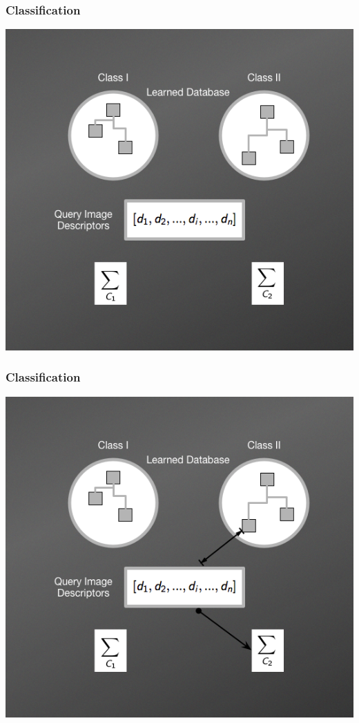 \documentclass[11pt]{beamer}
\begin{document}
    \begin{frame}
        \frametitle{Classification}
        \begin{center}
            \item \includegraphics[scale=0.38]{img/NBNNMethod1.png}     
        \end{center}
    \end{frame}
    
    \begin{frame}
        \frametitle{Classification}
        \begin{center}
            \item \includegraphics[scale=0.38]{img/NBNNMethod2.png}        
        \end{center}
    \end{frame}
    
\end{document}
